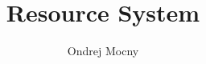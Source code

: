 \documentclass[12pt, a4paper]{article}
\begin{document}
\title{Resource System}
\author{Ondrej Mocny}
\maketitle

\tableofcontents

\newpage


\end{document}
